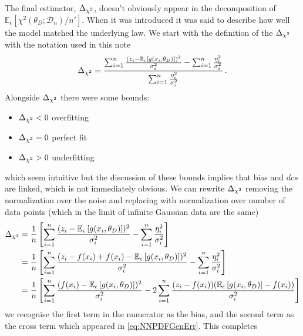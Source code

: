 The final estimator, $\Delta_{\chi^{2}}$, doesn't obviously appear in the decomposition of \newline
$\mathbb{E}_{\epsilon}\left[\chi^2(\theta_D; \mathcal{D}_{n})/n'\right]$.
When it was introduced it was said to describe how well the model matched the
underlying law. We start with the definition of the $\Delta_{\chi^{2}}$ with the notation
used in this note
%
\begin{equation}
        \Delta_{\chi^{2}} = \frac{
            \sum_{i=1}^{n} \frac{(z_i -
            \mathbb{E}_{\epsilon}\left[g(x_i,\theta_D)\right])^2}{\sigma_i^2} -
            \sum_{i=1}^n \frac{\eta_i^2}{\sigma_i^2}}{
                \sum_{i=1}^n \frac{\eta_i^2}{\sigma_i^2}} \, .
\end{equation}
Alongside $\Delta_{\chi^{2}}$ there were some bounds:
%
\begin{itemize}
    \item $\Delta_{\chi^{2}} < 0$ overfitting
    \item $\Delta_{\chi^{2}} = 0$ perfect fit
    \item $\Delta_{\chi^{2}} > 0$ underfitting
\end{itemize}
%
which seem intuitive but the discussion of these bounds implies that bias and
$dcs$ are linked, which is not immediately obvious. We can rewrite
$\Delta_{\chi^{2}}$ removing the normalization over the noise and replacing with normalization
over number of data points (which in the limit of infinite Gaussian data are
the same)
%
\begin{equation}
    \begin{split}
        \Delta_{\chi^{2}} &= \frac{1}{n}\left[ \sum_{i=1}^{n} \frac{(z_i -
        \mathbb{E}_{\epsilon}\left[g(x_i,\theta_D)\right])^2}{\sigma_i^2} -
        \sum_{i=1}^n \frac{\eta_i^2}{\sigma_i^2} \right] \\
        &= \frac{1}{n}\left[ \sum_{i=1}^{n} \frac{(z_i - f(x_i) + f(x_i) -
        \mathbb{E}_{\epsilon}\left[g(x_i,\theta_D)\right])^2}{\sigma_i^2} -
        \sum_{i=1}^n \frac{\eta_i^2}{\sigma_i^2} \right] \\
        &= \frac{1}{n} \left[ \sum_{i=1}^{n} \frac{(f(x_i) -
        \mathbb{E}_{\epsilon}\left[g(x_i,\theta_D)\right])^2}{\sigma_i^2} -
        2\sum_{i=1}^n \frac{
            (z_i - f(x_i))(\mathbb{E}_{\epsilon}\left[g(x_i,\theta_D)\right] - f(x_i))}{
                \sigma_i^2}\right]
    \end{split}
    \label{eq: deltachi2tobias}
\end{equation}
%
we recognise the first term in the numerator as the bias, and the second term
as the cross term which appeared in \eqref{eq:NNPDFGenErr}. This completes
